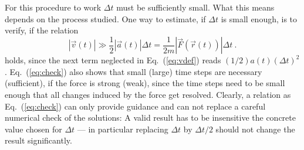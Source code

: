 \documentclass[12pt,ngerman,american]{iopart}
\begin{document}
For this procedure to work $\Delta t$ must be sufficiently small.
What this means depends on the process studied.
One way to estimate, if $\Delta t$ is small enough, is to verify, if the relation
\begin{equation}
|\vec v(t)| \gg \frac12|\vec a(t)|\Delta t = \frac{1}{2m} |\vec F(\vec r(t)) |\Delta t\ .
\label{eq:check}
\end{equation}
holds, since the next term neglected in Eq.~(\ref{eq:vdef}) reads $(1/2)a(t)(\Delta t)^2$.
Eq.~({\ref{eq:check}}) also shows that small (large) time steps are necessary (sufficient), if the force is strong (weak), since the time steps need to be small enough that all changes induced by the force get resolved.
Clearly, a relation as Eq.~({\ref{eq:check}}) can only provide guidance and can not replace a careful numerical check of the solutions: A valid result has to be insensitive the concrete value chosen for $\Delta t$ --- in particular replacing $\Delta t$ by $\Delta t/2$ should not change the result significantly.



\end{document}
